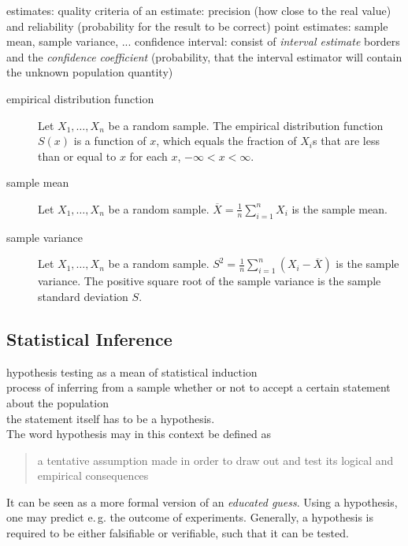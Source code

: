 \documentclass{article}
\begin{document}
estimates:
quality criteria of an estimate: precision (how close to the real value) and reliability (probability for the result to be correct)
point estimates: sample mean, sample variance, ...
confidence interval: consist of \emph{interval estimate} borders and the \emph{confidence coefficient} (probability, that the interval estimator will contain the unknown population quantity)

\begin{description}
	\item[empirical distribution function] Let $X_1, \ldots, X_n$ be a random sample. The empirical distribution function $S(x)$ is a function of $x$, which equals the fraction of $X_i$s that are less than or equal to $x$ for each $x$, $-\infty<x<\infty$.
	\item[sample mean] Let $X_1, \ldots, X_n$ be a random sample. $\overline{X} = \frac{1}{n}\sum_{i=1}^{n}X_i$ is the sample mean.
	\item[sample variance] Let $X_1, \ldots, X_n$ be a random sample. $S^2 = \frac{1}{n}\sum_{i=1}^{n}(X_i-\overline{X})$ is the sample variance. The positive square root of the sample variance is the sample standard deviation $S$.
\end{description}

\subsection{Statistical Inference}



hypothesis testing as a mean of statistical induction \\
process of inferring from a sample whether or not to accept a certain statement about the population \\
the statement itself has to be a hypothesis. \\
%
The word hypothesis may in this context be defined as
\begin{quote}
	a tentative assumption made in order to draw out and test its logical and empirical consequences \cite{merriamwebster}
\end{quote}
It can be seen as a more formal version of an \emph{educated guess}.
Using a hypothesis, one may predict e.\,g. the outcome of experiments.
Generally, a hypothesis is required to be either falsifiable or verifiable, such that it can be tested.
\end{document}
